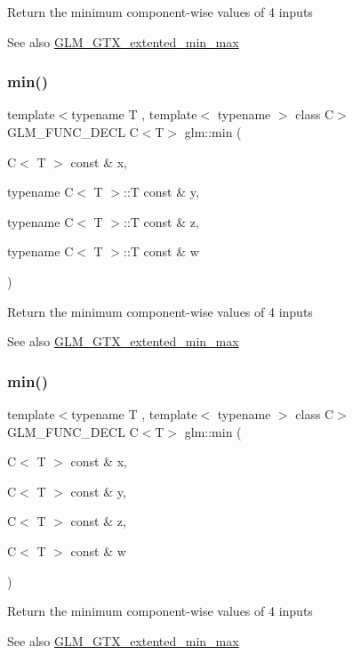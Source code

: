 Return the minimum component-\/wise values of 4 inputs \begin{DoxySeeAlso}{See also}
\hyperlink{group__gtx__extented__min__max}{G\+L\+M\+\_\+\+G\+T\+X\+\_\+extented\+\_\+min\+\_\+max} 
\end{DoxySeeAlso}
\mbox{\label{group__gtx__extented__min__max_ga4fe35dd31dd0c45693c9b60b830b8d47}} 
\subsubsection{\texorpdfstring{min()}{min()}\hspace{0.1cm}{\footnotesize\ttfamily [5/6]}}
{\footnotesize\ttfamily template$<$typename T , template$<$ typename $>$ class C$>$ \\
G\+L\+M\+\_\+\+F\+U\+N\+C\+\_\+\+D\+E\+CL C$<$T$>$ glm\+::min (\begin{DoxyParamCaption}\item[{C$<$ T $>$ const \&}]{x,  }\item[{typename C$<$ T $>$\+::T const \&}]{y,  }\item[{typename C$<$ T $>$\+::T const \&}]{z,  }\item[{typename C$<$ T $>$\+::T const \&}]{w }\end{DoxyParamCaption})}

Return the minimum component-\/wise values of 4 inputs \begin{DoxySeeAlso}{See also}
\hyperlink{group__gtx__extented__min__max}{G\+L\+M\+\_\+\+G\+T\+X\+\_\+extented\+\_\+min\+\_\+max} 
\end{DoxySeeAlso}
\mbox{\label{group__gtx__extented__min__max_ga7471ea4159eed8dd9ea4ac5d46c2fead}} 
\subsubsection{\texorpdfstring{min()}{min()}\hspace{0.1cm}{\footnotesize\ttfamily [6/6]}}
{\footnotesize\ttfamily template$<$typename T , template$<$ typename $>$ class C$>$ \\
G\+L\+M\+\_\+\+F\+U\+N\+C\+\_\+\+D\+E\+CL C$<$T$>$ glm\+::min (\begin{DoxyParamCaption}\item[{C$<$ T $>$ const \&}]{x,  }\item[{C$<$ T $>$ const \&}]{y,  }\item[{C$<$ T $>$ const \&}]{z,  }\item[{C$<$ T $>$ const \&}]{w }\end{DoxyParamCaption})}

Return the minimum component-\/wise values of 4 inputs \begin{DoxySeeAlso}{See also}
\hyperlink{group__gtx__extented__min__max}{G\+L\+M\+\_\+\+G\+T\+X\+\_\+extented\+\_\+min\+\_\+max} 
\end{DoxySeeAlso}
